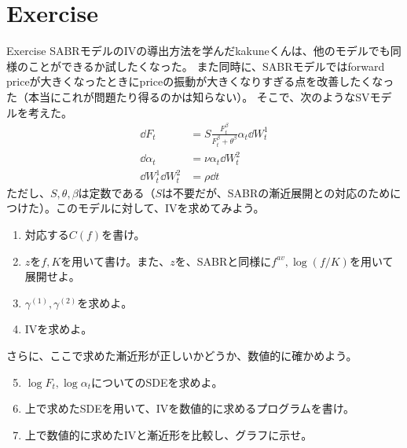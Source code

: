 \documentclass[dvipdfmx,9pt]{beamer}
\begin{document}
\section{Exercise}
\begin{frame}{Exercise}
  SABRモデルのIVの導出方法を学んだkakuneくんは、他のモデルでも同様のことができるか試したくなった。
  また同時に、SABRモデルではforward priceが大きくなったときにpriceの振動が大きくなりすぎる点を改善したくなった（本当にこれが問題たり得るのかは知らない）。
  そこで、次のようなSVモデルを考えた。
  \begin{align}
    \dd F_{t}                   & = S\frac{F_{t}^{\beta}}{F_{t}^{\beta} + \theta^{\beta}} \alpha_{t} \dd W_{t}^{1} \\
    \dd \alpha_{t}              & = \nu \alpha_{t} \dd W_{t}^{2}                                                   \\
    \dd W_{t}^{1} \dd W_{t}^{2} & = \rho \dd t
  \end{align}
  ただし、$S,\theta,\beta$は定数である（$S$は不要だが、SABRの漸近展開との対応のためにつけた）。このモデルに対して、IVを求めてみよう。
  \begin{enumerate}
    \item 対応する$C(f)$を書け。
    \item $z$を$f,K$を用いて書け。また、$z$を、SABRと同様に$f^{av},\log (f/K)$を用いて展開せよ。
    \item $\gamma^{(1)},\gamma^{(2)}$を求めよ。
    \item IVを求めよ。
  \end{enumerate}
  さらに、ここで求めた漸近形が正しいかどうか、数値的に確かめよう。
  \begin{enumerate}
    \setcounter{enumi}{4}
    \item $\log F_{t} , \log \alpha_{t}$についてのSDEを求めよ。
    \item 上で求めたSDEを用いて、IVを数値的に求めるプログラムを書け。
    \item 上で数値的に求めたIVと漸近形を比較し、グラフに示せ。
  \end{enumerate}

\end{frame}
\end{document}
